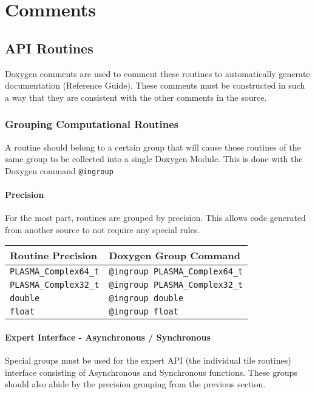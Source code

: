 
\chapter{Comments}



\section{API Routines}

Doxygen comments are used to comment these routines to automatically generate documentation (Reference Guide).  These comments must be constructed in such a way that they are consistent with the other comments in the source.

\subsection{Grouping Computational Routines}
A routine should belong to a certain group that will cause those routines of the same group to be collected into a single Doxygen Module.  This is done with the Doxygen command {\tt @ingroup}

\subsubsection{Precision}
For the most part, routines are grouped by precision.  This allows code generated from another source to not require any special rules.

\begin{tabular}{l|l}
\hline
Routine Precision & Doxygen Group Command \\
\hline
{\tt PLASMA\_Complex64\_t} & {\tt @ingroup PLASMA\_Complex64\_t} \\
{\tt PLASMA\_Complex32\_t} & {\tt @ingroup PLASMA\_Complex32\_t} \\
{\tt double} & {\tt @ingroup double} \\
{\tt float} & {\tt @ingroup float}
\end{tabular}

\subsubsection{Expert Interface - Asynchronous / Synchronous}
Special groups must be used for the expert API (the individual tile routines) interface consisting of Asynchronous and Synchronous functions.  These groups should also abide by the precision grouping from the previous section.

